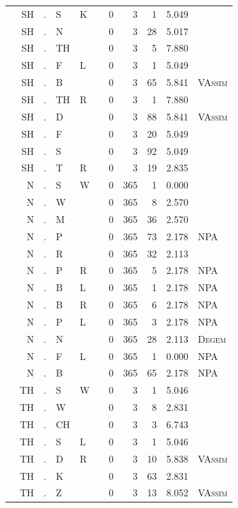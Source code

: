 \documentclass[12pt]{article}
\begin{document}
\begin{longtable}{r@{ } r@{ } c@{ } l@{ } l@{ } l@{ } r r r r l }
 & SH & . & S & K &  & 0 & 3 & 1 & 5.049 &  \\
 & SH & . & N &  &  & 0 & 3 & 28 & 5.017 &  \\
 & SH & . & TH &  &  & 0 & 3 & 5 & 7.880 &  \\
 & SH & . & F & L &  & 0 & 3 & 1 & 5.049 &  \\
 & SH & . & B &  &  & 0 & 3 & 65 & 5.841 & \textsc{VAssim} \\
 & SH & . & TH & R &  & 0 & 3 & 1 & 7.880 &  \\
 & SH & . & D &  &  & 0 & 3 & 88 & 5.841 & \textsc{VAssim} \\
 & SH & . & F &  &  & 0 & 3 & 20 & 5.049 &  \\
 & SH & . & S &  &  & 0 & 3 & 92 & 5.049 &  \\
 & SH & . & T & R &  & 0 & 3 & 19 & 2.835 &  \\
 & N & . & S & W &  & 0 & 365 & 1 & 0.000 &  \\
 & N & . & W &  &  & 0 & 365 & 8 & 2.570 &  \\
 & N & . & M &  &  & 0 & 365 & 36 & 2.570 &  \\
 & N & . & P &  &  & 0 & 365 & 73 & 2.178 & \textsc{NPA} \\
 & N & . & R &  &  & 0 & 365 & 32 & 2.113 &  \\
 & N & . & P & R &  & 0 & 365 & 5 & 2.178 & \textsc{NPA} \\
 & N & . & B & L &  & 0 & 365 & 1 & 2.178 & \textsc{NPA} \\
 & N & . & B & R &  & 0 & 365 & 6 & 2.178 & \textsc{NPA} \\
 & N & . & P & L &  & 0 & 365 & 3 & 2.178 & \textsc{NPA} \\
 & N & . & N &  &  & 0 & 365 & 28 & 2.113 & \textsc{Degem} \\
 & N & . & F & L &  & 0 & 365 & 1 & 0.000 & \textsc{NPA} \\
 & N & . & B &  &  & 0 & 365 & 65 & 2.178 & \textsc{NPA} \\
 & TH & . & S & W &  & 0 & 3 & 1 & 5.046 &  \\
 & TH & . & W &  &  & 0 & 3 & 8 & 2.831 &  \\
 & TH & . & CH &  &  & 0 & 3 & 3 & 6.743 &  \\
 & TH & . & S & L &  & 0 & 3 & 1 & 5.046 &  \\
 & TH & . & D & R &  & 0 & 3 & 10 & 5.838 & \textsc{VAssim} \\
 & TH & . & K &  &  & 0 & 3 & 63 & 2.831 &  \\
 & TH & . & Z &  &  & 0 & 3 & 13 & 8.052 & \textsc{VAssim} \\

\end{longtable}
\end{document}
